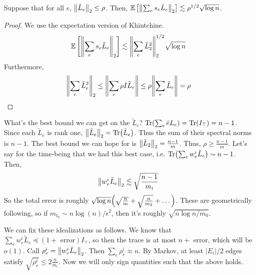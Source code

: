 \begin{lemma}
    Suppose that for all $e$, $\norm{\tilde{L}_e}_2 \le \rho$.
    Then, $\mathbb{E}\left[ \norm{\sum_e s_e \tilde{L}_e}_2 \right] \lesssim \rho^{1/2} \sqrt{\log n}$.

    \begin{proof}
        We use the expectation version of Khintchine.
        \[ \mathbb{E}\left[ \norm{\sum_e s_e \tilde{L}_e}_2  \right] \lesssim \norm{\sum_e \tilde{L}_2^2}_2^{1/2} \sqrt{\log n} \]
        Furthermore, 
        \[ \norm{\sum_e \tilde{L}_e^2 }_2 \le \norm{\sum_e \rho I \tilde{L}_e} \le \rho \norm{\sum_e \tilde{L}_e} = \rho \]
    \end{proof}
\end{lemma}

What's the best bound we can get on the $\tilde{L}_e$? $\Tr(\sum_e \tilde{e} L_e) = \Tr(I_{\top}) = n - 1$.
Since each $\tilde{L}_e$ is rank one, $\norm{\tilde{L}_e}_2 = \Tr(\tilde{L}_e)$.
Thus the sum of their spectral norms is $n - 1$. The best bound we can
hope for is $\norm{\tilde{L}_2}_2 = \frac{n - 1}{m}$. Thus, $\rho \ge \frac{ n - 1}{m}$.
Let's say for the time-being that we had this best case, i.e.
$\Tr(\sum_e w_e^{i} \tilde{L}_e) \sim n - 1$. Then,
\[ \norm{w_e^i \tilde{L}_e}_2 \lesssim \sqrt{\frac{n - 1}{m_i}} \]
So the total error is roughly $\sqrt{\log n}\qty(\sqrt{\frac{n}{m}} + \sqrt{\frac{n}{m_2}} + \dots)$.
These are geometrically following,
so if $m_{t_0} \sim n \log(n)/\epsilon^2$, then it's roughly $\sqrt{n \log n/m_0}$.

We can fix these idealizations as follows. We know that $\sum_e w_e^i \tilde{L}_e \preceq (1 + \text{ error}) I_{\top}$,
so then the trace is at most $n + \text{ error}$, which will be $o(1)$.
Call $\rho_{e}^i = \norm{w_e^i \tilde{L}_e}_2$. Then $\sum_e \rho_e^i \approx n$.
By Markov, at least $|E_i|/2$ edges satisfy $\sqrt{\rho_e^i} \le 2 \frac{n}{m_i}$.
Now we will only sign quantities such that the above holds.

